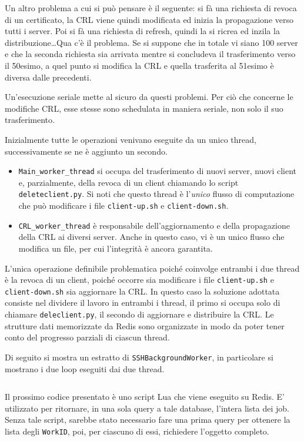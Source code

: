 Un altro problema a cui si può pensare è il seguente: si fà una richiesta di revoca di un certificato,
la CRL viene quindi modificata ed inizia la propagazione verso tutti i server.
Poi si fà una richiesta di refresh, quindi la si ricrea ed inzila la distribuzione\ldots Qua c'è il
problema. Se si suppone che in totale vi siano 100 server e che la seconda richiesta sia arrivata
mentre si concludeva il trasferimento verso il 50esimo, a quel punto si modifica la CRL
e quella trasferita al 51esimo è diversa dalle precedenti.

Un'esecuzione seriale mette al sicuro da questi problemi.
Per ciò che concerne le modifiche CRL, esse stesse sono
schedulata in maniera seriale, non solo il suo trasferimento.


Inizialmente tutte le operazioni venivano eseguite da un unico thread, successivamente se ne
è aggiunto un secondo.
\begin{itemize}
	\item \texttt{Main\_worker\_thread} si occupa del trasferimento di nuovi server, nuovi
	      client e, parzialmente, della revoca di un client chiamando lo script \texttt{deleteclient.py}.
	      Si noti che questo thread è l'\textit{unico} flusso di computazione che può modificare
	      i file \texttt{client-up.sh} e \texttt{client-down.sh}.
	\item \texttt{CRL\_worker\_thread} è responsabile dell'aggiornamento e della propagazione
	      della CRL ai diversi server. Anche in questo caso, vi è un unico flusso che modifica
	      un file, per cui l'integrità è ancora garantita.
\end{itemize}
L'unica operazione definibile problematica poiché coinvolge entrambi i due thread è la revoca
di un client, poiché occorre sia modificare i file \texttt{client-up.sh} e \texttt{client-down.sh}
sia aggiornare la CRL. In questo caso la soluzione adottata consiste nel dividere il lavoro in
entrambi i thread, il primo si occupa solo di chiamare \texttt{deleclient.py}, il secondo
di aggiornare e distribuire la CRL. Le strutture dati memorizzate da Redis sono organizzate in modo
da poter tener conto del progresso parziali di ciascun thread.


Di seguito si mostra un estratto di \texttt{SSHBackgroundWorker}, in particolare si mostrano
i due loop eseguiti dai due thread.

\inputminted[tabsize=4, breaklines, fontsize=\footnotesize]{python}{code_samples/sshworker_loops.py}

Il prossimo codice presentato è uno script Lua che viene eseguito su Redis. E' utilizzato
per ritornare, in una sola query a tale database, l'intera lista dei job.
Senza tale script, sarebbe stato necessario fare una prima query per ottenere la lista degli
\texttt{WorkID}, poi, per ciascuno di essi, richiedere l'oggetto completo.

